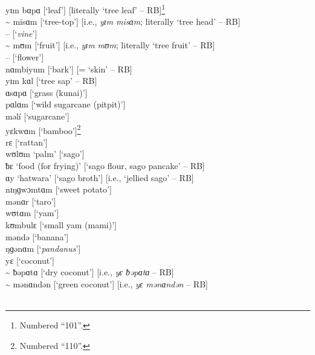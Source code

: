 \noindent yɪm bɑpɑ     [‘leaf’] [literally ‘tree leaf’ -- RB]\footnote{Numbered “101”.}\\
{\textasciitilde} misɑm    [‘tree-top’] [i.e., \textit{yɪm misɑm}; literally ‘tree head’ -- RB]\\
 --        [‘\textit{vine}’]\\
{\textasciitilde} mʊm       [‘fruit’] [i.e., \textit{yɪm mʊm}; literally ‘tree fruit’ -- RB]\\
 --        [‘flower’]\\
nɑmbiyum    [‘bark’] [= ‘skin’ -- RB]\\
yɪm kɑl    [‘tree sap’ -- RB]\\
ɑsɑpɑ      [‘grass (kunai)’]\\
pɑlɑm      [‘wild sugarcane (pitpit)’]\\
məlí      [‘sugarcane’]\\
yɛkwɑm    [‘bamboo’]\footnote{Numbered “110”.}\\
rɛ        [‘rattan’]\\
wʊlʊm      ‘palm’ [‘sago’]\\
ƀɛ        ‘food (for frying)’ [‘sago flour, sago pancake’ -- RB]\\
ɑy        ‘hatwara’ [‘sago broth’] [i.e., ‘jellied sago’ -- RB]\\
nɪŋɡwɔmtɑm  [‘sweet potato’]\\
mənɑr       [‘taro’]\\
wʊtɑm     [‘yam’]\\
kʊmbulɛ     [‘small yam (mami)’]\\
məndə       [‘banana’]\\
ŋɡənɑm     [‘\textit{pandanus}’]\\
yɛ         [‘coconut’]\\
{\textasciitilde} ƀəpɑtɑ     [‘dry coconut’] [i.e., \textit{yɛ ƀəpɑtɑ} -- RB]\\
{\textasciitilde} mənɑndən   [‘green coconut’] [i.e., \textit{yɛ mənɑndən} -- RB]\\

\\

